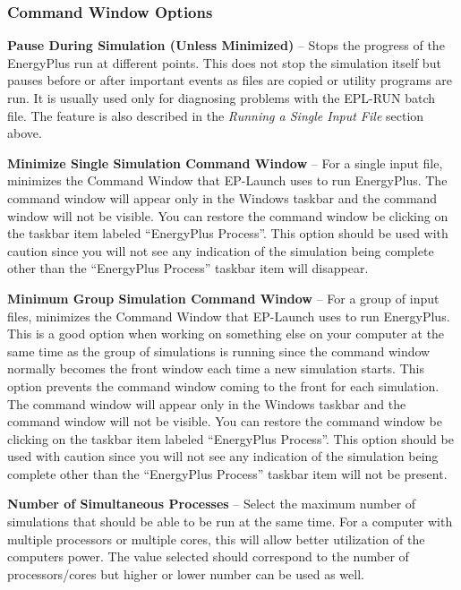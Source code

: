 \subsubsection{Command Window Options}\label{command-window-options}

\textbf{Pause During Simulation (Unless Minimized)} -- Stops the progress of the EnergyPlus run at different points. This does not stop the simulation itself but pauses before or after important events as files are copied or utility programs are run. It is usually used only for diagnosing problems with the EPL-RUN batch file. The feature is also described in the \emph{Running a Single Input File} section above.

\textbf{Minimize Single Simulation Command Window} -- For a single input file, minimizes the Command Window that EP-Launch uses to run EnergyPlus. The command window will appear only in the Windows taskbar and the command window will not be visible. You can restore the command window be clicking on the taskbar item labeled ``EnergyPlus Process''. This option should be used with caution since you will not see any indication of the simulation being complete other than the ``EnergyPlus Process'' taskbar item will disappear.

\textbf{Minimum Group Simulation Command Window} -- For a group of input files, minimizes the Command Window that EP-Launch uses to run EnergyPlus. This is a good option when working on something else on your computer at the same time as the group of simulations is running since the command window normally becomes the front window each time a new simulation starts. This option prevents the command window coming to the front for each simulation. The command window will appear only in the Windows taskbar and the command window will not be visible. You can restore the command window be clicking on the taskbar item labeled ``EnergyPlus Process''. This option should be used with caution since you will not see any indication of the simulation being complete other than the ``EnergyPlus Process'' taskbar item will not be present.

\textbf{Number of Simultaneous Processes} -- Select the maximum number of simulations that should be able to be run at the same time. For a computer with multiple processors or multiple cores, this will allow better utilization of the computers power. The value selected should correspond to the number of processors/cores but higher or lower number can be used as well.

